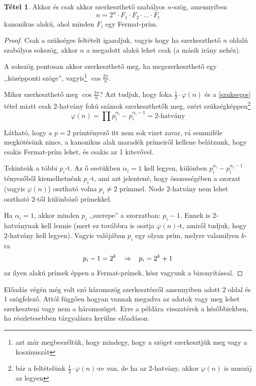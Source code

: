\documentclass[12pt]{book}
\theoremstyle{plain} %
\theoremstyle{definition} %
\newtheorem{theo/}{Tétel}[section]
\newenvironment{theo}
  {\renewcommand{\qedsymbol}{$\clubsuit$}%
   \pushQED{\qed}\begin{theo/}}
  {\popQED\end{theo/}}
\theoremstyle{remark}
\renewcommand\qedsymbol{$\blacksquare$}
\numberwithin{equation}{section}  %
\begin{document}
	\begin{theo}
		Akkor és csak akkor szerkeszthető szabályos $n$-szög, amennyiben
		\[ n = 2^{\alpha} \cdot F_1\cdot F_2 \cdot \ldots \cdot F_t  \]
		kanonikus alakú, ahol minden $F_i$ egy Fermat-prím.
	\end{theo}

	\begin{proof}
		Csak a szükséges feltételt igazoljuk, vagyis hogy ha szerkeszthető $n$ oldalú szabályos sokszög, akkor $n$ a megadott alakú lehet csak (a másik irány nehéz).
		
		A sokszög pontosan akkor szerkeszthető meg, ha megszerkeszthető egy ,,középponti szöge'', vagyis\footnote{azt már megbeszéltük, hogy mindegy, hogy a szöget szerkesztjük meg vagy a koszinuszát} $\cos \frac{2\pi}{n}$.
		
		Mikor szerkeszthető meg $\cos \frac{2\pi}{n}$? Azt tudjuk, hogy foka $\frac{1}{2}\cdot \varphi(n)$ és a \ref{szukseges} tétel miatt csak 2-hatvány fokú számok szerkeszthetők meg, ezért szükségképpen\footnote{bár a feltételünk $\frac{1}{2}\cdot \varphi(n)$-re van, de ha az 2-hatvány, akkor $\varphi(n)$ is muszáj az legyen}
		\[ \varphi(n) = \prod p_i^{\alpha_i} - p_i^{\alpha_i-1}  = \text{2-hatvány} \]
		
		Látható, hogy a $p=2$ prímtényező itt nem sok vizet zavar, rá semmiféle megkötésünk nincs, a kanonikus alak maradék prímeiről kellene belátnunk, hogy csakis Fermat-prím lehet, és csakis az 1 kitevővel.
		
		Tekintsük a többi $p_i$-t. Az ő esetükben $\alpha_i=1$ kell legyen, különben $p_i^{\alpha_i} - p_i^{\alpha_i-1}$ tényezőből kiemelhetnénk $p_i$-t, ami azt jelentené, hogy összességében a szorzat (vagyis $\varphi(n)$) osztható volna $p_i\neq 2$ prímmel. Node $2$-hatvány nem lehet osztható $2$-től különböző prímekkel.
		
		Ha $\alpha_i = 1$, akkor minden $p_i$ ,,szerepe'' a szorzatban: $p_i -1$. Ennek is $2$-hatványnak kell lennie (mert ez továbbra is osztja $\varphi(n)$-t, amiről tudjuk, hogy $2$-hatvány kell legyen). Vagyis valójában $p_i$ egy olyan prím, melyre valamilyen $k$-ra
		\[ p_i -1 = 2^k \hspace{3mm} \Rightarrow \hspace{3mm} p_i = 2^k +1 \]
		az ilyen alakú prímek éppen a Fermat-prímek, kész vagyunk a bizonyítással.
	\end{proof}
	
	Előadás végén még volt szó háromszög szerkesztésről amennyiben adott 2 oldal és 1 szögfelező. Attól függően hogyan vannak megadva az adatok vagy meg lehet szerkeszteni vagy nem a háromszöget. Erre a példára visszatérek a későbbiekben, ha részletesebben tárgyalásra kerülne előadáson.
	
\end{document}
